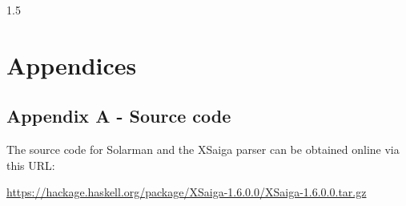 \documentclass[fleqn, oneside, 12pt]{book}
\theoremstyle{definitionsty}
\newcommand{\uwinonehalfspacelen}{1.5}
\newcommand{\uwindefaultspacelen}{\uwinonehalfspacelen}
\newenvironment{uwindefaultspaceenv}%
{\begin{spacing}{\uwindefaultspacelen}}%
	{\end{spacing}}
\begin{document}
\clearpage
{}
{}
\tableofcontents


\begin{uwindefaultspaceenv}

\clearpage
{}
{}
\listoffigures

\clearpage
{}
{}
\listofappendices

\clearpage
{}
{}
\listoftheorems[ignoreall,show={definition}]


\clearpage
{}

\renewcommand{\refname}{Bibliography}




%
%
%
%
%
%
%
%



\chapter*{Appendices}

\section*{Appendix A - Source code}

The source code for Solarman and the XSaiga parser can be obtained online via this URL:

{\noindent \small \url{https://hackage.haskell.org/package/XSaiga-1.6.0.0/XSaiga-1.6.0.0.tar.gz}}


\end{uwindefaultspaceenv}
\end{document}

